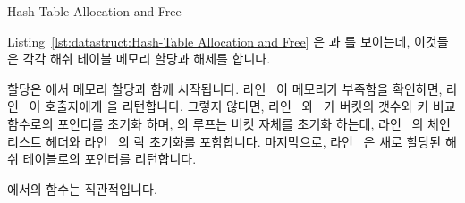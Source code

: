 \begin{listing}[tb]

\caption{Hash-Table Allocation and Free}
\label{lst:datastruct:Hash-Table Allocation and Free}
\end{listing}

Listing~\ref{lst:datastruct:Hash-Table Allocation and Free}
은  과  를 보이는데, 이것들은 각각 해쉬
테이블 메모리 할당과 해제를 합니다.
\begin{fcvref}
할당은  에서 메모리 할당과 함께 시작됩니다.
라인~ 이 메모리가 부족함을 확인하면, 라인~ 이
호출자에게  을 리턴합니다.
그렇지 않다면, 라인~ 와~ 가 버킷의 갯수와 키
비교 함수로의 포인터를 초기화 하며,  의 루프는 버킷
자체를 초기화 하는데, 라인~ 의 체인 리스트 헤더와
라인~ 의 락 초기화를 포함합니다.
마지막으로, 라인~ 은 새로 할당된 해쉬 테이블로의 포인터를
리턴합니다.
\end{fcvref}
\begin{fcvref}
 에서의  함수는 직관적입니다.
\end{fcvref}

\iffalse

